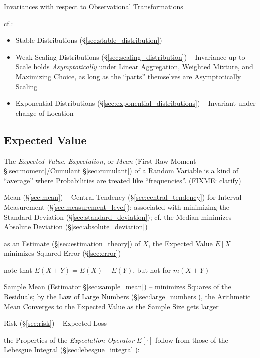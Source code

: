 Invariances with respect to Observational Transformations

cf.:
\begin{itemize}
  \item Stable Distributions (\S\ref{sec:stable_distribution})
  \item Weak Scaling Distributions (\S\ref{sec:scaling_distribution}) --
    Invariance up to Scale holds \emph{Asymptotically} under Linear Aggregation,
    Weighted Mixture, and Maximizing Choice, as long as the ``parts'' themselves
    are Asymptotically Scaling
  \item Exponential Distributions (\S\ref{sec:exponential_distributions}) --
    Invariant under change of Location
\end{itemize}



\subsection{Expected Value}\label{sec:expected_value}

The \emph{Expected Value}, \emph{Expectation}, or \emph{Mean} (First Raw Moment
\S\ref{sec:moment}/Cumulant \S\ref{sec:cumulant}) of a Random Variable is a kind
of ``average'' where Probabilities are treated like ``frequencies''. (FIXME:
clarify)

\fist Mean (\S\ref{sec:mean}) -- Central Tendency (\S\ref{sec:central_tendency})
for Interval Measurement (\S\ref{sec:measurement_level}); associated with
minimizing the Standard Deviation (\S\ref{sec:standard_deviation}); cf. the
Median minimizes Absolute Deviation (\S\ref{sec:absolute_deviation})

as an Estimate (\S\ref{sec:estimation_theory}) of $X$, the Expected Value $E[X]$
minimizes Squared Error (\S\ref{sec:error})

note that $E(X + Y) = E(X) + E(Y)$, but not for $m(X+Y)$

\fist Sample Mean (Estimator \S\ref{sec:sample_mean}) -- minimizes Squares of
the Residuals;
by the Law of Large Numbers (\S\ref{sec:large_numbers}), the Arithmetic Mean
Converges to the Expected Value as the Sample Size gets larger

\fist Risk (\S\ref{sec:risk}) -- Expected Loss

the Properties of the \emph{Expectation Operator} $E[\cdot]$ follow from those
of the Lebesgue Integral (\S\ref{sec:lebesgue_integral}):

